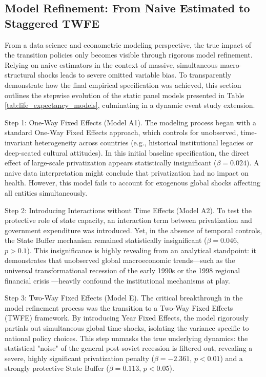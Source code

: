 \documentclass[12pt]{article}
\begin{document}
\subsection{Model Refinement: From Naive Estimated to Staggered TWFE}

From a data science and econometric modeling perspective, the true impact of the transition policies only becomes visible through rigorous model refinement. 
Relying on naive estimators in the context of massive, simultaneous macro-structural shocks leads to severe omitted variable bias. To transparently demonstrate 
how the final empirical specification was achieved, this section outlines the stepwise evolution of the static panel models presented in Table 
\ref{tab:life_expectancy_models}, culminating in a dynamic event study extension.

Step 1: One-Way Fixed Effects (Model A1). The modeling process began with a standard One-Way Fixed Effects approach, which controls for unobserved, time-invariant 
heterogeneity across countries (e.g., historical institutional legacies or deep-seated cultural attitudes). In this initial baseline specification, the direct effect 
of large-scale privatization appears statistically insignificant ($\beta=0.024$). A naive data interpretation might conclude that privatization had no impact on health. 
However, this model fails to account for exogenous global shocks affecting all entities simultaneously.

Step 2: Introducing Interactions without Time Effects (Model A2). To test the protective role of state capacity, an interaction term between privatization and government 
expenditure was introduced. Yet, in the absence of temporal controls, the State Buffer mechanism remained statistically insignificant ($\beta=0.046$, $p>0.1$). This insignificance 
is highly revealing from an analytical standpoint: it demonstrates that unobserved global macroeconomic trends---such as the universal transformational recession of the early 
1990s or the 1998 regional financial crisis \citep{EBRD1999}---heavily confound the institutional mechanisms at play.

Step 3: Two-Way Fixed Effects (Model E). The critical breakthrough in the model refinement process was the transition to a Two-Way Fixed Effects (TWFE) framework. By introducing 
Year Fixed Effects, the model rigorously partials out simultaneous global time-shocks, isolating the variance specific to national policy choices. This step unmasks the true underlying 
dynamics: the statistical "noise" of the general post-soviet recession is filtered out, revealing a severe, highly significant privatization penalty ($\beta = -2.361$, $p < 0.01$) and a 
strongly protective State Buffer ($\beta = 0.113$, $p < 0.05$).
\end{document}
